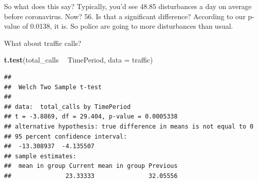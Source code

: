 \documentclass[]{book}
\newenvironment{Shaded}{\begin{snugshade}}{\end{snugshade}}
\newcommand{\DataTypeTok}[1]{\textcolor[rgb]{0.13,0.29,0.53}{#1}}
\newcommand{\DecValTok}[1]{\textcolor[rgb]{0.00,0.00,0.81}{#1}}
\newcommand{\KeywordTok}[1]{\textcolor[rgb]{0.13,0.29,0.53}{\textbf{#1}}}
\newcommand{\NormalTok}[1]{#1}
\newcommand{\OperatorTok}[1]{\textcolor[rgb]{0.81,0.36,0.00}{\textbf{#1}}}
\newcommand{\StringTok}[1]{\textcolor[rgb]{0.31,0.60,0.02}{#1}}
\begin{document}
So what does this say? Typically, you'd see 48.85 disturbances a day on average before coronavirus. Now? 56. Is that a significant difference? According to our p-value of 0.0138, it is. So police are going to more disturbances than usual.

What about traffic calls?

\begin{Shaded}
\end{Shaded}

\begin{Shaded}
\begin{Highlighting}[]
\KeywordTok{t.test}\NormalTok{(total_calls }\OperatorTok{~}\StringTok{ }\NormalTok{TimePeriod, }\DataTypeTok{data =}\NormalTok{ traffic)}
\end{Highlighting}
\end{Shaded}

\begin{verbatim}
## 
##  Welch Two Sample t-test
## 
## data:  total_calls by TimePeriod
## t = -3.8869, df = 29.404, p-value = 0.0005338
## alternative hypothesis: true difference in means is not equal to 0
## 95 percent confidence interval:
##  -13.308937  -4.135507
## sample estimates:
##  mean in group Current mean in group Previous 
##               23.33333               32.05556
\end{verbatim}
\end{document}
